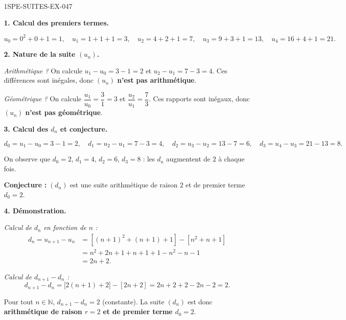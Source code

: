 \begin{corrige}{1SPE-SUITES-EX-047}

\textbf{1. Calcul des premiers termes.}

\[
u_0 = 0^2 + 0 + 1 = 1, \quad u_1 = 1 + 1 + 1 = 3, \quad u_2 = 4 + 2 + 1 = 7, \quad u_3 = 9 + 3 + 1 = 13, \quad u_4 = 16 + 4 + 1 = 21.
\]

\textbf{2. Nature de la suite $(u_n)$.}


\textit{Arithmétique ?} On calcule $u_1 - u_0 = 3 - 1 = 2$ et $u_2 - u_1 = 7 - 3 = 4$. Ces différences sont inégales, donc $(u_n)$ \textbf{n'est pas arithmétique}.

\textit{Géométrique ?} On calcule $\dfrac{u_1}{u_0} = \dfrac{3}{1} = 3$ et $\dfrac{u_2}{u_1} = \dfrac{7}{3}$. Ces rapports sont inégaux, donc $(u_n)$ \textbf{n'est pas géométrique}.

\textbf{3. Calcul des $d_n$ et conjecture.}

\[
d_0 = u_1 - u_0 = 3 - 1 = 2, \quad d_1 = u_2 - u_1 = 7 - 3 = 4, \quad d_2 = u_3 - u_2 = 13 - 7 = 6, \quad d_3 = u_4 - u_3 = 21 - 13 = 8.
\]

On observe que $d_0 = 2$, $d_1 = 4$, $d_2 = 6$, $d_3 = 8$ : les $d_n$ augmentent de $2$ à chaque fois.

\textbf{Conjecture :} $(d_n)$ est une suite arithmétique de raison $2$ et de premier terme $d_0 = 2$.

\textbf{4. Démonstration.}


\textit{Calcul de $d_n$ en fonction de $n$ :}
\begin{align*}
d_n = u_{n+1} - u_n &= \left[(n+1)^2 + (n+1) + 1\right] - \left[n^2 + n + 1\right] \\
&= n^2 + 2n + 1 + n + 1 + 1 - n^2 - n - 1 \\
&= 2n + 2.
\end{align*}

\textit{Calcul de $d_{n+1} - d_n$ :}
\[
d_{n+1} - d_n = \bigl[2(n+1) + 2\bigr] - [2n + 2] = 2n + 2 + 2 - 2n - 2 = 2.
\]

Pour tout $n \in \mathbb{N}$, $d_{n+1} - d_n = 2$ (constante). La suite $(d_n)$ est donc \textbf{arithmétique de raison $r = 2$ et de premier terme $d_0 = 2$}.


\end{corrige}
